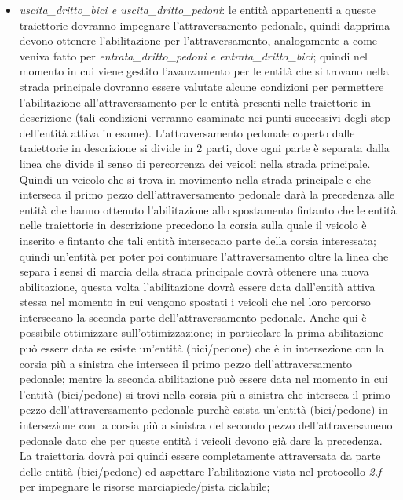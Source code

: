 \begin{enumerate}
\begin{enumerate}
\begin{itemize}
\item \textit{usci\-ta\_drit\-to\_bi\-ci e usci\-ta\_drit\-to\_pe\-do\-ni}: le entità appartenenti a queste traiettorie dovranno impegnare l'attraversamento pedonale, quindi dapprima devono ottenere l'abilitazione per l'attraversamento, analogamente a come veniva fatto per \textit{en\-tra\-ta\_drit\-to\_pe\-do\-ni e en\-tra\-ta\_drit\-to\_bi\-ci}; quindi nel momento in cui viene gestito l'avanzamento per le entità che si trovano nella strada principale dovranno essere valutate alcune condizioni per permettere l'abilitazione all'attraversamento per le entità presenti nelle traiettorie in descrizione (tali condizioni verranno esaminate nei punti successivi degli step dell'entità attiva in esame). L'attraversamento pedonale coperto dalle traiettorie in descrizione si divide in 2 parti, dove ogni parte è separata dalla linea che divide il senso di percorrenza dei veicoli nella strada principale. Quindi un veicolo che si trova in movimento nella strada principale e che interseca il primo pezzo dell'attraversamento pedonale darà la precedenza alle entità che hanno ottenuto l'abilitazione allo spostamento fintanto che le entità nelle traiettorie in descrizione precedono la corsia sulla quale il veicolo è inserito e fintanto che tali entità intersecano parte della corsia interessata; quindi un'entità per poter poi continuare l'attraversamento oltre la linea che separa i sensi di marcia della strada principale dovrà ottenere una nuova abilitazione, questa volta l'abilitazione dovrà essere data dall'entità attiva stessa nel momento in cui vengono spostati i veicoli che nel loro percorso intersecano la seconda parte dell'attraversamento pedonale. Anche qui è possibile ottimizzare sull'ottimizzazione; in particolare la prima abilitazione può essere data se esiste un'entità (bici/pedone) che è in intersezione con la corsia più a sinistra che interseca il primo pezzo dell'attraversamento pedonale; mentre la seconda abilitazione può essere data nel momento in cui l'entità (bici/pedone) si trovi nella corsia più a sinistra che interseca il primo pezzo dell'attraversamento pedonale purchè esista un'entità (bici/pedone) in intersezione con la corsia più a sinistra del secondo pezzo dell'attraversameno pedonale dato che per queste entità i veicoli devono già dare la precedenza. La traiettoria dovrà poi quindi essere completamente attraversata da parte delle entità (bici/pedone) ed aspettare l'abilitazione vista nel protocollo \textit{2.f} per impegnare le risorse marciapiede/pista ciclabile;

\end{itemize}
\end{enumerate}
\end{enumerate}
